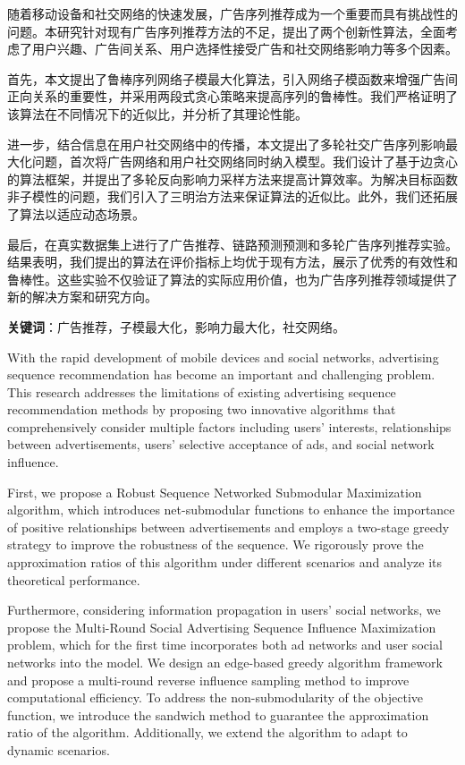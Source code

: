 \cleardoublepage
{}

随着移动设备和社交网络的快速发展，广告序列推荐成为一个重要而具有挑战性的问题。本研究针对现有广告序列推荐方法的不足，提出了两个创新性算法，全面考虑了用户兴趣、广告间关系、用户选择性接受广告和社交网络影响力等多个因素。

首先，本文提出了鲁棒序列网络子模最大化算法，引入网络子模函数来增强广告间正向关系的重要性，并采用两段式贪心策略来提高序列的鲁棒性。我们严格证明了该算法在不同情况下的近似比，并分析了其理论性能。

进一步，结合信息在用户社交网络中的传播，本文提出了多轮社交广告序列影响最大化问题，首次将广告网络和用户社交网络同时纳入模型。我们设计了基于边贪心的算法框架，并提出了多轮反向影响力采样方法来提高计算效率。为解决目标函数非子模性的问题，我们引入了三明治方法来保证算法的近似比。此外，我们还拓展了算法以适应动态场景。

最后，在真实数据集上进行了广告推荐、链路预测预测和多轮广告序列推荐实验。结果表明，我们提出的算法在评价指标上均优于现有方法，展示了优秀的有效性和鲁棒性。这些实验不仅验证了算法的实际应用价值，也为广告序列推荐领域提供了新的解决方案和研究方向。


\textbf{关键词}：广告推荐，子模最大化，影响力最大化，社交网络。


\cleardoublepage
{}

With the rapid development of mobile devices and social networks, advertising sequence recommendation has become an important and challenging problem. This research addresses the limitations of existing advertising sequence recommendation methods by proposing two innovative algorithms that comprehensively consider multiple factors including users' interests, relationships between advertisements, users' selective acceptance of ads, and social network influence.

First, we propose a Robust Sequence Networked Submodular Maximization algorithm, which introduces net-submodular functions to enhance the importance of positive relationships between advertisements and employs a two-stage greedy strategy to improve the robustness of the sequence. We rigorously prove the approximation ratios of this algorithm under different scenarios and analyze its theoretical performance.

Furthermore, considering information propagation in users' social networks, we propose the Multi-Round Social Advertising Sequence Influence Maximization problem, which for the first time incorporates both ad networks and user social networks into the model. We design an edge-based greedy algorithm framework and propose a multi-round reverse influence sampling method to improve computational efficiency. To address the non-submodularity of the objective function, we introduce the sandwich method to guarantee the approximation ratio of the algorithm. Additionally, we extend the algorithm to adapt to dynamic scenarios.

